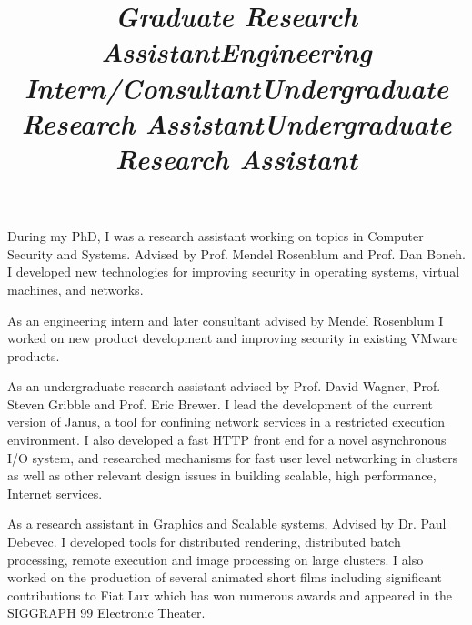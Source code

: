 \begin{resume}
\begin{position}
\end{position}

\title{\em Graduate Research Assistant}

\begin{position}
During my PhD, I was a research assistant working on topics in Computer Security
and Systems.  Advised by Prof. Mendel Rosenblum and Prof. Dan Boneh. I developed
new technologies for improving security in operating systems,
virtual machines, and networks.  \end{position}

\pagebreak
\title{\em Engineering Intern/Consultant}
\begin{position}
As an engineering intern and later consultant advised by Mendel Rosenblum I
worked on new product development and improving security in existing
VMware products.

\end{position}

\title{\em Undergraduate Research Assistant}
\begin{position}
As an undergraduate research assistant advised by Prof. David Wagner, Prof.
Steven Gribble and Prof. Eric Brewer.  I lead the development of the current
version of Janus, a tool for confining network services in a restricted
execution environment.  I also developed a fast HTTP front end for a novel
asynchronous I/O system,  and researched mechanisms for fast user level
networking in clusters as well as other relevant design issues in building
scalable, high performance, Internet services.
\end{position}


\title{\em Undergraduate Research Assistant}
\begin{position}
As a research assistant in Graphics and Scalable systems, Advised by Dr.
Paul Debevec. I developed tools for distributed rendering, distributed
batch processing, remote execution and image processing on large
clusters. I also worked on the production of several animated short films
including significant contributions to Fiat Lux which has won numerous
awards and appeared in the SIGGRAPH 99 Electronic Theater.
\end{position}


\end{resume}
